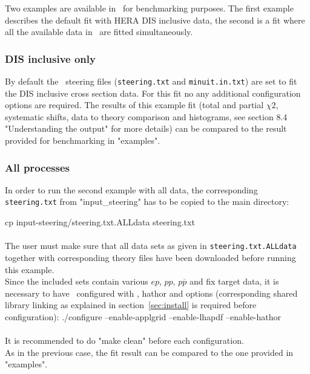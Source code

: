 
\label{section:example}
Two examples are available in \fitter\ for benchmarking purposes.
The first example describes the default fit with HERA DIS inclusive data,
the second is a fit where all the available data in \fitter\ are fitted simultaneously.

\subsubsection{DIS inclusive only}
By default the \fitter\ steering files ({\tt steering.txt} and {\tt minuit.in.txt})
are set to fit the DIS inclusive cross section data. For this fit no any additional
configuration options are required.
The results of this example fit (total and partial $\chi2$, systematic shifts, 
data to theory comparison and histograms, see section 8.4 "Understanding the output" for more details) 
can be compared to the result provided for benchmarking in "examples".

\subsubsection{All processes}
In order to run the second example with all data, the corresponding
{\tt steering.txt} from "input\_steering" has to be copied to the main directory:

\goodbreak                 
cp input-steering/steering.txt.ALLdata steering.txt
\\ \\
The user must make sure that all data sets as given in {\tt steering.txt.ALLdata} together with corresponding theory files have been downloaded  
before running this example. 
\\
Since the included sets contain various $ep$, $pp$, $p \overline p$ and fix target
data, it is necessary to have \fitter\ configured with \applgrid, hathor and 
\lhapdf options (corresponding shared library linking as explained in section~\ref{sec:install} is
required before configuration): 
\goodbreak
./configure --enable-applgrid --enable-lhapdf --enable-hathor
\\ \\
It is recommended to do "make clean" before each configuration. \\        
As in the previous case, the fit result can be compared to the one provided in "examples".



